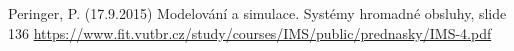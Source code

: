 \documentclass[a4paper, 14pt]{article}
\begin{document}
\newpage
\begin{thebibliography}{9}
 	Peringer, P. (17.9.2015) Modelování a simulace. Systémy hromadné obsluhy, slide 136
	 \href{https://www.fit.vutbr.cz/study/courses/IMS/public/prednasky/IMS-4.pdf}{https://www.fit.vutbr.cz/study/courses/IMS/public/prednasky/IMS-4.pdf}
\end{thebibliography}


\end{document}
